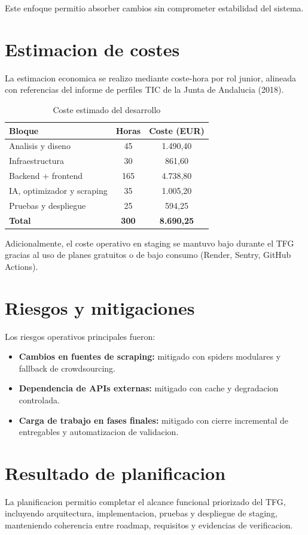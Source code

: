 Este enfoque permitio absorber cambios sin comprometer estabilidad del sistema.

\section{Estimacion de costes}

La estimacion economica se realizo mediante coste-hora por rol junior,
alineada con referencias del informe de perfiles TIC de la Junta de Andalucia (2018).

\begin{table}[h]
\centering
\caption{Coste estimado del desarrollo}
\label{tab:coste-estimado}
\begin{tabular}{|l|c|c|}
\hline
\textbf{Bloque} & \textbf{Horas} & \textbf{Coste (EUR)} \\
\hline
Analisis y diseno & 45 & 1.490,40 \\
Infraestructura & 30 & 861,60 \\
Backend + frontend & 165 & 4.738,80 \\
IA, optimizador y scraping & 35 & 1.005,20 \\
Pruebas y despliegue & 25 & 594,25 \\
\hline
\textbf{Total} & \textbf{300} & \textbf{8.690,25} \\
\hline
\end{tabular}
\end{table}

Adicionalmente, el coste operativo en staging se mantuvo bajo durante el TFG
gracias al uso de planes gratuitos o de bajo consumo (Render, Sentry, GitHub Actions).

\section{Riesgos y mitigaciones}

Los riesgos operativos principales fueron:

\begin{itemize}
	\item \textbf{Cambios en fuentes de scraping:} mitigado con spiders modulares y
		fallback de crowdsourcing.
	\item \textbf{Dependencia de APIs externas:} mitigado con cache y degradacion controlada.
	\item \textbf{Carga de trabajo en fases finales:} mitigado con cierre incremental de
		entregables y automatizacion de validacion.
\end{itemize}

\section{Resultado de planificacion}

La planificacion permitio completar el alcance funcional priorizado del TFG,
incluyendo arquitectura, implementacion, pruebas y despliegue de staging,
manteniendo coherencia entre roadmap, requisitos y evidencias de verificacion.



